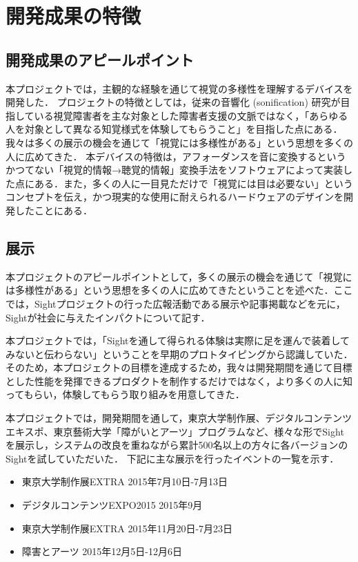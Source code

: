\section{開発成果の特徴}
\subsection{開発成果のアピールポイント}
本プロジェクトでは，主観的な経験を通じて視覚の多様性を理解するデバイスを開発した．
プロジェクトの特徴としては，従来の音響化 (sonification) 研究が目指している視覚障害者を主な対象とした障害者支援の文脈ではなく，「あらゆる人を対象として異なる知覚様式を体験してもらうこと」を目指した点にある．我々は多くの展示の機会を通じて「視覚には多様性がある」という思想を多くの人に広めてきた．
本デバイスの特徴は，アフォーダンスを音に変換するというかつてない「視覚的情報→聴覚的情報」変換手法をソフトウェアによって実装した点にある．また，多くの人に一目見ただけで「視覚には目は必要ない」というコンセプトを伝え，かつ現実的な使用に耐えられるハードウェアのデザインを開発したことにある．

\subsection{展示}
本プロジェクトのアピールポイントとして，多くの展示の機会を通じて「視覚には多様性がある」という思想を多くの人に広めてきたということを述べた．ここでは，Sightプロジェクトの行った広報活動である展示や記事掲載などを元に，Sightが社会に与えたインパクトについて記す．


本プロジェクトでは，「Sightを通して得られる体験は実際に足を運んで装着してみないと伝わらない」ということを早期のプロトタイピングから認識していた．そのため，本プロジェクトの目標を達成するため，我々は開発期間を通じて目標とした性能を発揮できるプロダクトを制作するだけではなく，より多くの人に知ってもらい，体験してもらう取り組みを用意してきた．

本プロジェクトでは，開発期間を通して，東京大学制作展、デジタルコンテンツエキスポ、東京藝術大学「障がいとアーツ」プログラムなど、様々な形でSightを展示し，システムの改良を重ねながら累計500名以上の方々に各バージョンのSightを試していただいた．
下記に主な展示を行ったイベントの一覧を示す．

\begin{itemize}
 \item 東京大学制作展EXTRA 2015年7月10日-7月13日
 \item デジタルコンテンツEXPO2015 2015年9月
 \item 東京大学制作展EXTRA 2015年11月20日-7月23日
 \item 障害とアーツ 2015年12月5日-12月6日
\end{itemize}


